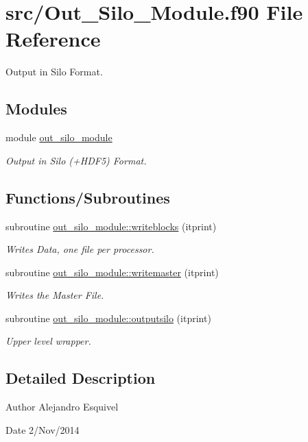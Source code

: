\hypertarget{_out___silo___module_8f90}{}\section{src/\+Out\+\_\+\+Silo\+\_\+\+Module.f90 File Reference}
\label{_out___silo___module_8f90}


Output in Silo Format.  


\subsection*{Modules}
\begin{DoxyCompactItemize}
\item 
module \hyperlink{namespaceout__silo__module}{out\+\_\+silo\+\_\+module}
\begin{DoxyCompactList}\small\item\em Output in Silo (+\+H\+D\+F5) Format. \end{DoxyCompactList}\end{DoxyCompactItemize}
\subsection*{Functions/\+Subroutines}
\begin{DoxyCompactItemize}
\item 
subroutine \hyperlink{namespaceout__silo__module_acfa5a749647a6a7c95e48e3ad58e4139}{out\+\_\+silo\+\_\+module\+::writeblocks} (itprint)
\begin{DoxyCompactList}\small\item\em Writes Data, one file per processor. \end{DoxyCompactList}\item 
subroutine \hyperlink{namespaceout__silo__module_aa984d6044bf34559a87a9020c4a07c3a}{out\+\_\+silo\+\_\+module\+::writemaster} (itprint)
\begin{DoxyCompactList}\small\item\em Writes the Master File. \end{DoxyCompactList}\item 
subroutine \hyperlink{namespaceout__silo__module_a65763f848b9b5da2a20d8b55f53f8515}{out\+\_\+silo\+\_\+module\+::outputsilo} (itprint)
\begin{DoxyCompactList}\small\item\em Upper level wrapper. \end{DoxyCompactList}\end{DoxyCompactItemize}


\subsection{Detailed Description}
\begin{DoxyAuthor}{Author}
Alejandro Esquivel 
\end{DoxyAuthor}
\begin{DoxyDate}{Date}
2/\+Nov/2014 
\end{DoxyDate}
